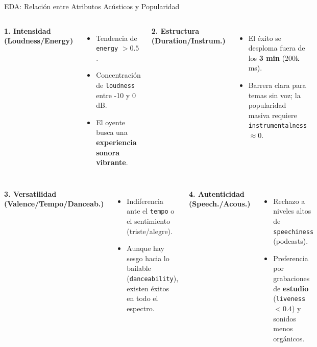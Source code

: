 \documentclass[10pt, xcolor=x11names,compress]{beamer}
\begin{document}
\begin{frame}{EDA: Relación entre Atributos Acústicos y Popularidad}
    \small
    \begin{columns}[t]
        \textbf{1. Intensidad (Loudness/Energy)}
        \begin{itemize}
            \item Tendencia de \texttt{energy} $> 0.5$.
            \item Concentración de \texttt{loudness} entre -10 y 0 dB.
            \item El oyente busca una \textbf{experiencia sonora vibrante}.
        \end{itemize}
        \textbf{2. Estructura (Duration/Instrum.)}
        \begin{itemize}
            \item El éxito se desploma fuera de los \textbf{3 min} (200k ms).
            \item Barrera clara para temas sin voz; la popularidad masiva requiere \texttt{instrumentalness} $\approx 0$.
        \end{itemize}
    \end{columns}
    \vspace{1em}
    \vspace{1em}
    \begin{columns}[t]
        \textbf{3. Versatilidad (Valence/Tempo/Danceab.)}
        \begin{itemize}
            \item Indiferencia ante el \texttt{tempo} o el sentimiento (triste/alegre).
            \item Aunque hay sesgo hacia lo bailable (\texttt{danceability}), existen éxitos en todo el espectro.
        \end{itemize}
        \textbf{4. Autenticidad (Speech./Acous.)}
        \begin{itemize}
            \item Rechazo a niveles altos de \texttt{speechiness} (podcasts).
            \item Preferencia por grabaciones de \textbf{estudio} (\texttt{liveness} $< 0.4$) y sonidos menos orgánicos.
        \end{itemize}
    \end{columns}
\end{frame}
\end{document}
